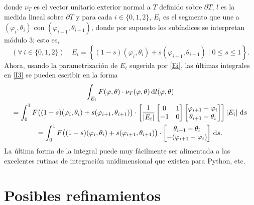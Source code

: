 \documentclass[reqno]{amsart}
\newcommand{\dd}[1][y]{\if#1y\,\fi{\mathrm d}} %
\newcommand{\abs}[2][y]{\if#1y\left\fi\lvert#2\if#1y\right\fi\rvert} %
\begin{document}
%
donde $\nu_T$ es el vector unitario exterior normal a $T$ definido sobre $\partial T$, $l$ es la medida lineal sobre $\partial T$ y para cada $i \in \{0, 1, 2\}$, $E_i$ es el segmento que une a $(\varphi_i, \theta_i)$ con $(\varphi_{i+1}, \theta_{i+1})$, donde por supuesto los subíndices se interpretan módulo $3$; esto es,
%
\begin{equation}\label{Ei}
(\forall\,i\in\{0,1,2\}) \quad E_i = \left\{ (1-s) (\varphi_i, \theta_i) + s (\varphi_{i+1}, \theta_{i+1}) \mid 0 \leq s \leq 1 \right\}.
\end{equation}
%
Ahora, usando la parametrización de $E_i$ sugerida por \eqref{Ei}, las últimas integrales en \eqref{I3} se pueden escribir en la forma
%
\begin{multline}\label{lineIntegrals}
\int_{E_i} F(\varphi, \theta) \cdot \nu_T(\varphi,\theta) \dd l(\varphi, \theta)\\
= \int_0^1 F\big( (1-s) (\varphi_i, \theta_i) + s (\varphi_{i+1}, \theta_{i+1}) \big) \cdot \left[ \frac{1}{\abs{E_i}} \begin{bmatrix} 0 & 1\\-1 & 0\end{bmatrix} \begin{bmatrix} \varphi_{i+1}-\varphi_i \\ \theta_{i+1} - \theta_i \end{bmatrix} \right] \abs{E_i} \dd s\\
= \int_0^1 F\big( (1-s) (\varphi_i, \theta_i) + s (\varphi_{i+1}, \theta_{i+1}) \big) \cdot \begin{bmatrix} \theta_{i+1}-\theta_i\\ -(\varphi_{i+1} - \varphi_i) \end{bmatrix} \dd s.
\end{multline}
%
La última forma de la integral puede muy fácilmente ser alimentada a las excelentes rutinas de integración unidimensional que existen para Python, etc.

\section{Posibles refinamientos}
\end{document}
